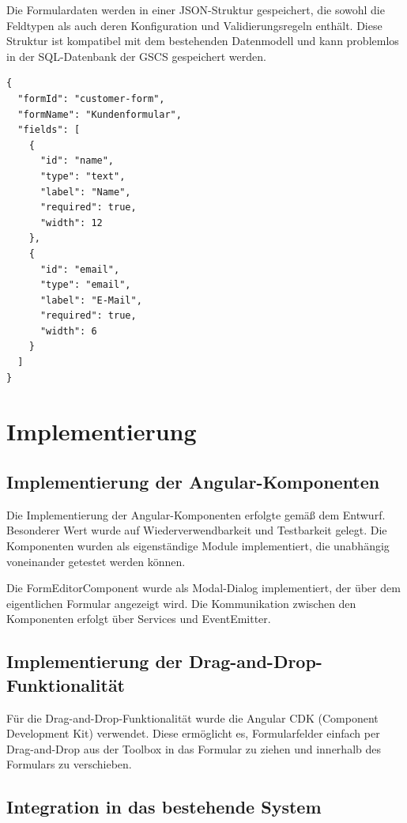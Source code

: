 \documentclass[a4paper,11pt]{article}
\begin{document}
Die Formulardaten werden in einer JSON-Struktur gespeichert, die sowohl die Feldtypen als auch deren Konfiguration und Validierungsregeln enthält. Diese Struktur ist kompatibel mit dem bestehenden Datenmodell und kann problemlos in der SQL-Datenbank der GSCS gespeichert werden.

\begin{verbatim}
{
  "formId": "customer-form",
  "formName": "Kundenformular",
  "fields": [
    {
      "id": "name",
      "type": "text",
      "label": "Name",
      "required": true,
      "width": 12
    },
    {
      "id": "email",
      "type": "email",
      "label": "E-Mail",
      "required": true,
      "width": 6
    }
  ]
}
\end{verbatim}

\section{Implementierung}

\subsection{Implementierung der Angular-Komponenten}

Die Implementierung der Angular-Komponenten erfolgte gemäß dem Entwurf. Besonderer Wert wurde auf Wiederverwendbarkeit und Testbarkeit gelegt. Die Komponenten wurden als eigenständige Module implementiert, die unabhängig voneinander getestet werden können.

Die FormEditorComponent wurde als Modal-Dialog implementiert, der über dem eigentlichen Formular angezeigt wird. Die Kommunikation zwischen den Komponenten erfolgt über Services und EventEmitter.

\subsection{Implementierung der Drag-and-Drop-Funktionalität}

Für die Drag-and-Drop-Funktionalität wurde die Angular CDK (Component Development Kit) verwendet. Diese ermöglicht es, Formularfelder einfach per Drag-and-Drop aus der Toolbox in das Formular zu ziehen und innerhalb des Formulars zu verschieben.

\subsection{Integration in das bestehende System}
\end{document}
